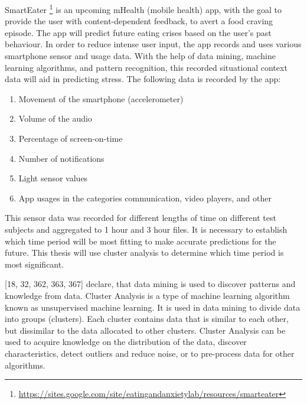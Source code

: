 






SmartEater \footnote{\url{https://sites.google.com/site/eatingandanxietylab/resources/smarteater}} is an upcoming mHealth (mobile health) app, with the goal to provide the user with content-dependent feedback, to avert a food craving episode. The app will predict future eating crises based on the user's past behaviour. In order to reduce intense user input, the app records and uses various smartphone sensor and usage data. With the help of data mining, machine learning algorithms, and pattern recognition, this recorded situational context data will aid in predicting stress. The following data is recorded by the app:

\begin{enumerate}
	\item Movement of the smartphone (accelerometer)
	\item Volume of the audio
	\item Percentage of screen-on-time
	\item Number of notifications
	\item Light sensor values
	\item App usages in the categories communication, video players, and other
\end{enumerate}



This sensor data was recorded for different lengths of time on different test subjects and aggregated to 1 hour and 3 hour files. It is necessary to establish which time period will be most fitting to make accurate predictions for the future. This thesis will use cluster analysis to determine which time period is most significant.

\textcite{han2011data}[18, 32, 362, 363, 367] declare, that data mining is used to discover patterns and knowledge from data. Cluster Analysis is a type of machine learning algorithm known as unsupervised machine learning. It is used in data mining to divide data into groups (clusters). Each cluster contains data that is similar to each other, but dissimilar to the data allocated to other clusters. Cluster Analysis can be used to acquire knowledge on the distribution of the data, discover characteristics, detect outliers and reduce noise, or to pre-process data for other algorithms. 

